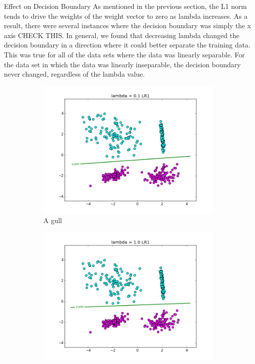 \documentclass[10pt,twoside]{article}
\begin{document}
Effect on Decision Boundary 
As mentioned in the previous section, the L1 norm tends to drive the weights of the weight vector to zero as lambda increases. As a result, there were several instances where the decision boundary was simply the x axis CHECK THIS. In general, we found that decreasing lambda changed the decision boundary in a direction where it could better separate the training data. This was true for all of the data sets where the data was linearly separable. For the data set in which the data was linearly inseparable, the decision boundary never changed, regardless of the lambda value. 

\begin{figure}[h]
        \begin{subfigure}[b]{0.25\textwidth}
                \centering
                \includegraphics[width=\linewidth]{Figures/P1/LR1__1.png}
                \caption{A gull}
                \label{fig:gull}
        \end{subfigure}%
        \begin{subfigure}[b]{0.25\textwidth}
                \centering
                \includegraphics[width=\linewidth]{Figures/P1/LR1_1.png}

\end{subfigure}
\end{figure}
\end{document}
